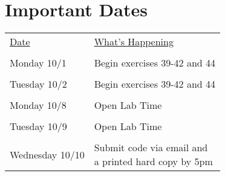 \documentclass[10pt]{article}
\begin{document}
\section*{Important Dates}


\begin{center}
\begin{tabular}{ll}
  \underline{Date} & \underline{What's Happening} \\ \\
   Monday 10/1 & Begin exercises 39-42 and 44 \\ \\
   Tuesday 10/2 & Begin exercises 39-42 and 44 \\ \\
   Monday 10/8 & Open Lab Time  \\ \\
   Tuesday 10/9 & Open Lab Time \\ \\
   Wednesday 10/10 & \makecell{Submit code via email and \\ a printed hard copy by 5pm} \\
\end{tabular}
\end{center}
\end{document}
